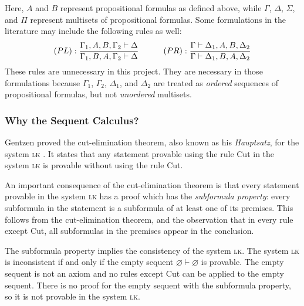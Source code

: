 Here, $A$ and $B$ represent propositional formulas as defined above, while $\Gamma$, $\Delta$, $\Sigma$, and $\Pi$ represent multisets of propositional formulas. Some formulations in the literature may include the following rules as well:
{
    \derivationfont
    \[
        (PL): \frac{\Gamma_1, A, B, \Gamma_2 \vdash \Delta}{\Gamma_1, B, A, \Gamma_2 \vdash \Delta} \quad\quad\quad (PR): \frac{\Gamma \vdash \Delta_1, A, B, \Delta_2}{\Gamma \vdash \Delta_1, B, A, \Delta_2}
    \]
}%
These rules are unnecessary in this project. They are necessary in those formulations because $\Gamma_1$, $\Gamma_2$, $\Delta_1$, and $\Delta_2$ are treated as \textit{ordered} sequences of propositional formulas, but not \textit{unordered} multisets.

\subsubsection{Why the Sequent Calculus?}
Gentzen proved the cut-elimination theorem, also known as his \textit{Hauptsatz}, for the system \textsc{lk} \cite{gentzen:1969}. It states that any statement provable using the rule Cut in the system \textsc{lk} is provable without using the rule Cut.

An important consequence of the cut-elimination theorem is that every statement provable in the system \textsc{lk} has a proof which has the \textit{subformula property}: every subformula in the statement is a subformula of at least one of its premises. This follows from the cut-elimination theorem, and the observation that in every rule except Cut, all subformulas in the premises appear in the conclusion.

The subformula property implies the consistency of the system \textsc{lk}. The system \textsc{lk} is inconsistent if and only if the empty sequent $\varnothing \vdash \varnothing$ is provable. The empty sequent is not an axiom and no rules except Cut can be applied to the empty sequent. There is no proof for the empty sequent with the subformula property, so it is not provable in the system \textsc{lk}.
